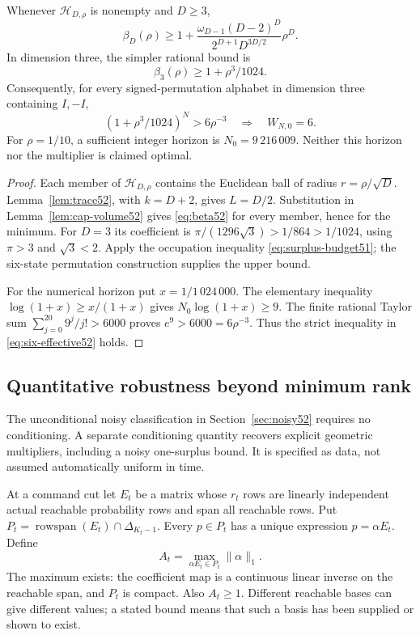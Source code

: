 \begin{theorem}\label{thm:beta52}
Whenever $\mathscr H_{D,\rho}$ is nonempty and $D\ge3$,
\begin{equation}\label{eq:beta52}
 \beta_D(\rho)\ge
 1+\frac{\omega_{D-1}(D-2)^D}{2^{D+1}D^{3D/2}}\rho^D.
\end{equation}
In dimension three, the simpler rational bound is
\begin{equation}\label{eq:beta3-rational52}
                         \beta_3(\rho)\ge1+\rho^3/1024.
\end{equation}
Consequently, for every signed-permutation alphabet in dimension
three containing $I,-I$,
\begin{equation}\label{eq:six-effective52}
 (1+\rho^3/1024)^N>6\rho^{-3}
                    \quad\Longrightarrow\quad W_{N,0}=6.
\end{equation}
For $\rho=1/10$, a sufficient integer horizon is
$N_0=9\,216\,009$. Neither this horizon nor the multiplier is claimed
optimal.
\end{theorem}
\begin{proof}
Each member of $\mathscr H_{D,\rho}$ contains the Euclidean ball
of radius $r=\rho/\sqrt D$. Lemma~\ref{lem:trace52}, with $k=D+2$,
gives $L=D/2$. Substitution in Lemma~\ref{lem:cap-volume52} gives
\eqref{eq:beta52} for every member, hence for the minimum.
For $D=3$ its coefficient is $\pi/(1296\sqrt3)>1/864>1/1024$,
using $\pi>3$ and $\sqrt3<2$. Apply the occupation inequality
\eqref{eq:surplus-budget51}; the six-state permutation construction
supplies the upper bound.

For the numerical horizon put $x=1/1\,024\,000$. The elementary
inequality $\log(1+x)\ge x/(1+x)$ gives
$N_0\log(1+x)\ge9$. The finite rational Taylor sum
$\sum_{j=0}^{20}9^j/j!>6000$ proves $e^9>6000=6\rho^{-3}$.
Thus the strict inequality in \eqref{eq:six-effective52} holds.
\end{proof}

\subsection{Quantitative robustness beyond minimum rank}
The unconditional noisy classification in Section~\ref{sec:noisy52}
requires no conditioning. A separate conditioning quantity recovers
explicit geometric multipliers, including a noisy one-surplus bound.
It is specified as data, not assumed automatically uniform in time.

At a command cut let $E_t$ be a matrix whose $r_t$ rows are linearly
independent actual reachable probability rows and span all reachable
rows. Put $P_t=\operatorname{rowspan}(E_t)\cap\Delta_{K_t-1}$.
Every $p\in P_t$ has a unique expression $p=\alpha E_t$. Define
\begin{equation}\label{eq:conditioning52}
                 A_t=\max_{\alpha E_t\in P_t}\|\alpha\|_1.
\end{equation}
The maximum exists: the coefficient map is a continuous linear
inverse on the reachable span, and $P_t$ is compact. Also $A_t\ge1$.
Different reachable bases can give different values; a stated bound
means that such a basis has been supplied or shown to exist.

